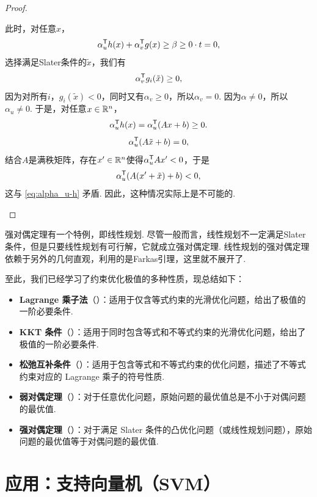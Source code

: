 \begin{proof}
\begin{itemize}
        此时，对任意$x$，
        \[\alpha_u^{\mathsf{T}} h(x)+\alpha_v^{\mathsf{T}} g(x)\geq\beta\geq 0\cdot t=0,\]
        选择满足Slater条件的$\tilde{x}$，我们有
        \[\alpha_v^{\mathsf{T}} g_i(\tilde{x})\geq 0,\]
        因为对所有$i$，$g_i(\tilde{x})<0$，同时又有$\alpha_v\geq 0$，所以$\alpha_v=0$. 因为$\alpha\neq 0$，所以$\alpha_u\neq 0$. 于是，对任意$x\in\mathbb{R}^n$，
        \begin{equation}
            \alpha_u^{\mathsf{T}} h(x)=\alpha_u^{\mathsf{T}}(Ax+b)\geq 0. \label{eq:alpha_u-h}
        \end{equation}
        \[\alpha_u^{\mathsf{T}} (A\tilde{x}+b)=0,\]
        结合$A$是满秩矩阵，存在$x'\in\mathbb{R}^n$使得$\alpha_u^{\mathsf{T}} Ax'<0$，于是
        \[\alpha_u^{\mathsf{T}} (A(x'+\tilde{x})+b)<0,\]
        这与 \eqref{eq:alpha_u-h} 矛盾. 因此，这种情况实际上是不可能的.
    \end{itemize}
\end{proof}

\begin{remark}
    强对偶定理有一个特例，即线性规划. 尽管一般而言，线性规划不一定满足Slater条件，但是只要线性规划有可行解，它就成立强对偶定理. 线性规划的强对偶定理依赖于另外的几何直观，利用的是Farkas引理，这里就不展开了. 
\end{remark}

至此，我们已经学习了约束优化极值的多种性质，现总结如下：
\begin{itemize}
    \item \textbf{Lagrange 乘子法}（）：适用于仅含等式约束的光滑优化问题，给出了极值的一阶必要条件. 
    \item \textbf{KKT 条件}（）：适用于同时包含等式和不等式约束的光滑优化问题，给出了极值的一阶必要条件. 
    \item \textbf{松弛互补条件}（）：适用于包含等式和不等式约束的优化问题，描述了不等式约束对应的 Lagrange 乘子的符号性质. 
    \item \textbf{弱对偶定理}（）：对于任意优化问题，原始问题的最优值总是不小于对偶问题的最优值. 
    \item \textbf{强对偶定理}（）：对于满足 Slater 条件的凸优化问题（或线性规划问题），原始问题的最优值等于对偶问题的最优值. 
\end{itemize}

\section{应用：支持向量机（SVM）}

